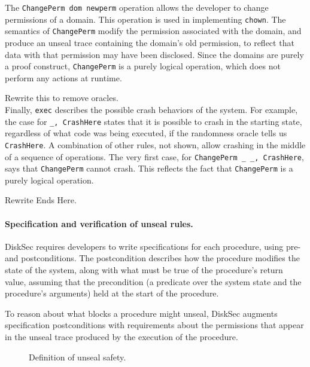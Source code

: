 The \texttt{ChangePerm dom newperm} operation allows the developer to
change permissions of a domain.  This operation is used in implementing
\texttt{chown}.  The semantics of \texttt{ChangePerm} modify the permission
associated with the domain, and produce an unseal trace containing the domain's
old permission, to reflect that data with that permission may have
been disclosed.  Since the domains are purely a proof construct,
\texttt{ChangePerm} is a purely logical operation, which does not perform
any actions at runtime.

{\color{red} Rewrite this to remove oracles. }\\
Finally, \texttt{exec} describes the possible crash behaviors of the system.
For example, the case for \texttt{\_, CrashHere} states that it is possible to
crash in the starting state, regardless of what code was being executed,
if the randomness oracle tells us \texttt{CrashHere}.  A combination
of other rules, not shown, allow crashing in the middle of a sequence of
operations.  The very first case, for \texttt{ChangePerm \_ \_, CrashHere},
says that \texttt{ChangePerm} cannot crash.  This reflects the fact that
\texttt{ChangePerm} is a purely logical operation.

{\color{red} Rewrite Ends Here. }\\

\paragraph{Specification and verification of unseal rules.}

DiskSec requires developers to write specifications for each procedure, using
pre- and postconditions.  The postcondition describes how the procedure
modifies the state of the system, along with what must be true of the procedure's
return value, assuming that the precondition (a predicate over the system
state and the procedure's arguments) held at the start of the procedure.

To reason about what blocks a procedure might unseal, DiskSec augments
specification postconditions with requirements about the permissions
that appear in the unseal trace produced by the execution of the procedure.

\begin{figure}[ht]
  
  \caption{Definition of unseal safety.}
  \label{fig:unseal-safety}
\end{figure}

